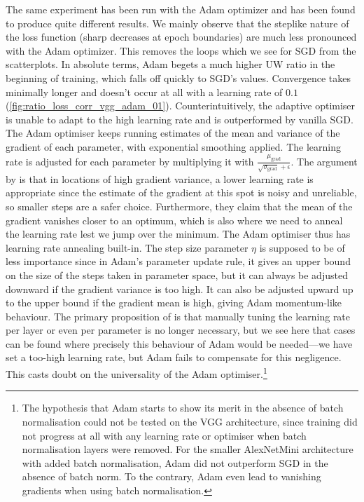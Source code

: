 The same experiment has been run with the Adam optimizer \citep{kingma2014adam}
and has been found to produce quite different results. We mainly observe that
the steplike nature of the loss function (sharp decreases at epoch boundaries)
are much less pronounced with the Adam optimizer. This removes the loops  which we see for
SGD from the scatterplots. In absolute terms, Adam begets a much higher UW ratio
in the beginning of training, which falls off quickly to SGD's values.
Convergence takes minimally longer and doesn't occur at all with a learning rate
of $0.1$ (\cref{fig:ratio_loss_corr_vgg_adam_01}). Counterintuitively, the
adaptive optimiser is unable to adapt to the high learning rate and is
outperformed by vanilla SGD. The Adam optimiser keeps running estimates of the
mean and variance of the gradient of each parameter, with exponential smoothing
applied. The learning rate is adjusted for each parameter by multiplying it with
$\frac{\mu_{\text{grad}}}{\sqrt{\sigma_{\text{grad}}} + \epsilon}$. The argument
by \citet{kingma2014adam} is that in locations of high gradient variance, a
lower learning rate is appropriate since the estimate of the gradient at this
spot is noisy and unreliable, so smaller steps are a safer choice. Furthermore,
they claim that the mean of the gradient vanishes closer to an optimum, which is
also where we need to anneal the learning rate lest we jump over the minimum.
The Adam optimiser thus has learning rate annealing built-in. The step size
parameter $\eta$ is supposed to be of less importance since in Adam's parameter
update rule, it gives an upper bound on the size of the steps taken in parameter
space, but it can always be adjusted downward if the gradient variance is too
high. It can also be adjusted upward up to the upper bound if the gradient mean
is high, giving Adam momentum-like behaviour. The primary proposition of
\citet{kingma2014adam} is that manually tuning the learning rate per layer or
even per parameter is no longer necessary, but we see here that cases can be
found where precisely this behaviour of Adam would be needed---we have set a
too-high learning rate, but Adam fails to compensate for this negligence. This
casts doubt on the universality of the Adam optimiser.\footnote{The hypothesis
that Adam starts to show its merit in the absence of batch normalisation could
not be tested on the VGG architecture, since training did not progress at all
with any learning rate or optimiser when batch normalisation layers were
removed. For the smaller AlexNetMini architecture with added batch
normalisation, Adam did not outperform SGD in the absence of batch norm. To the
contrary, Adam even lead to vanishing gradients when using batch normalisation.}


